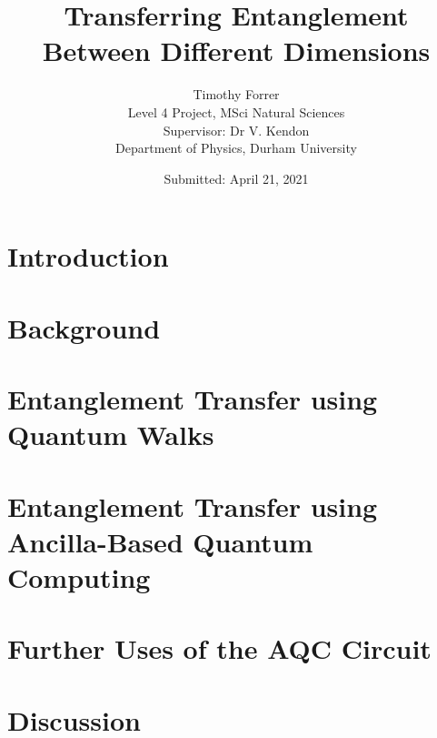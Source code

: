 \documentclass[12pt, onecolumn]{article}
\begin{document}
\title{\bf{Transferring Entanglement Between Different Dimensions}} 
\date{Submitted: April 21, 2021}
\author{
    Timothy Forrer\\
    Level 4 Project, MSci Natural Sciences\\
    Supervisor: Dr V. Kendon\\
    Department of Physics, Durham University}

\maketitle



\tableofcontents

\newpage

\section{Introduction}
\label{section:intro}


\section{Background}
\label{section:background}

\label{subsection:qc_primer}

\label{subsection:entangle}

\label{subsection:qw}

\label{subsection:aqc}

\section{Entanglement Transfer using Quantum Walks}
\label{section:qw_transfer}


\section{Entanglement Transfer using Ancilla-Based Quantum Computing}
\label{section:aqc_transfer}


\section{Further Uses of the AQC Circuit}
\label{section:furtheruses}


\section{Discussion}
\label{section:discussion}




\printbibliography[heading=bibintoc]

\newpage


\end{document}
